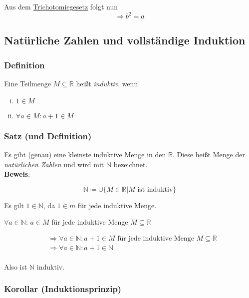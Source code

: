 \documentclass{article}
\begin{document}
Aus dem \hyperref[axiom:10]{Trichotomiegesetz} folgt nun
\[
  \Rightarrow b^2 = a
\]

\subsection{Natürliche Zahlen und vollständige Induktion}

\subsubsection{Definition}

Eine Teilmenge $M \subseteq \mathbb{R}$ heißt \emph{induktiv}, wenn

\begin{enumerate}[(i)]
\item $1 \in M$
\item $\forall a \in M \colon a + 1 \in M$
\end{enumerate}

\subsubsection{Satz (und Definition)}

Es gibt (genau) eine kleinste induktive Menge in den $\mathbb{R}$. Diese heißt Menge der \emph{natürlichen Zahlen}
und wird mit $\mathbb{N}$ bezeichnet. \\

\textbf{Beweis}:

\[
  \mathbb{N} \coloneqq \cup \{ M \in \mathbb{R} | M \text{ ist induktiv}\}
\]

Es gilt $1 \in \mathbb{N}$, da $1 \in m$ für jede induktive Menge.

$\forall a \in \mathbb{N}$: $a \in M$ für jede induktive Menge $M \subseteq \mathbb{R}$

\begin{align*}
  &\Rightarrow \forall a \in \mathbb{N} \colon a + 1 \in M \text{ für jede induktive Menge $M \subseteq \mathbb{R}$} \\
  &\Rightarrow \forall a \in \mathbb{N} \colon a + 1 \in \mathbb{N} \\
\end{align*}

Also ist $\mathbb{N}$ induktiv.

\subsubsection{Korollar (Induktionsprinzip)}
\label{sec:1.4.3}
\end{document}
